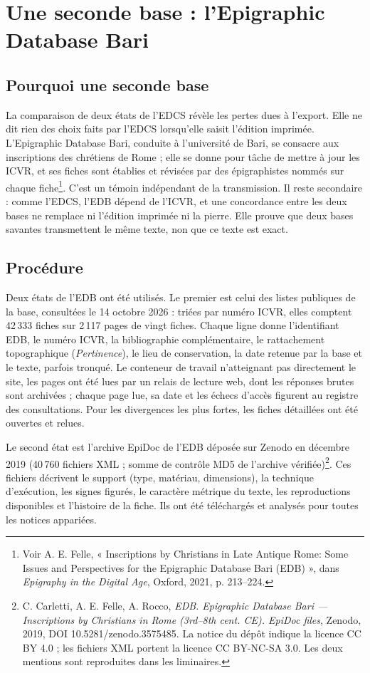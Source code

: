 \section{Une seconde base : l’Epigraphic Database Bari}

\subsection{Pourquoi une seconde base}

La comparaison de deux états de l’EDCS révèle les pertes dues à l’export. Elle ne dit rien des choix faits par l’EDCS lorsqu’elle saisit l’édition imprimée. L’Epigraphic Database Bari, conduite à l’université de Bari, se consacre aux inscriptions des chrétiens de Rome ; elle se donne pour tâche de mettre à jour les ICVR, et ses fiches sont établies et révisées par des épigraphistes nommés sur chaque fiche\footnote{Voir A. E. Felle, « Inscriptions by Christians in Late Antique Rome: Some Issues and Perspectives for the Epigraphic Database Bari (EDB) », dans \emph{Epigraphy in the Digital Age}, Oxford, 2021, p. 213–224.}. C’est un témoin indépendant de la transmission. Il reste secondaire : comme l’EDCS, l’EDB dépend de l’ICVR, et une concordance entre les deux bases ne remplace ni l’édition imprimée ni la pierre. Elle prouve que deux bases savantes transmettent le même texte, non que ce texte est exact.

\subsection{Procédure}

Deux états de l’EDB ont été utilisés. Le premier est celui des listes publiques de la base, consultées le 14 octobre 2026 : triées par numéro ICVR, elles comptent 42\,333 fiches sur 2\,117 pages de vingt fiches. Chaque ligne donne l’identifiant EDB, le numéro ICVR, la bibliographie complémentaire, le rattachement topographique (\emph{Pertinence}), le lieu de conservation, la date retenue par la base et le texte, parfois tronqué. Le conteneur de travail n’atteignant pas directement le site, les pages ont été lues par un relais de lecture web, dont les réponses brutes sont archivées ; chaque page lue, sa date et les échecs d’accès figurent au registre des consultations. Pour les divergences les plus fortes, les fiches détaillées ont été ouvertes et relues.

Le second état est l’archive EpiDoc de l’EDB déposée sur Zenodo en décembre 2019 (40\,760 fichiers XML ; somme de contrôle MD5 de l’archive vérifiée)\footnote{C. Carletti, A. E. Felle, A. Rocco, \emph{EDB. Epigraphic Database Bari — Inscriptions by Christians in Rome (3rd–8th cent. CE). EpiDoc files}, Zenodo, 2019, DOI 10.5281/zenodo.3575485. La notice du dépôt indique la licence CC BY 4.0 ; les fichiers XML portent la licence CC BY-NC-SA 3.0. Les deux mentions sont reproduites dans les liminaires.}. Ces fichiers décrivent le support (type, matériau, dimensions), la technique d’exécution, les signes figurés, le caractère métrique du texte, les reproductions disponibles et l’histoire de la fiche. Ils ont été téléchargés et analysés pour toutes les notices appariées.

